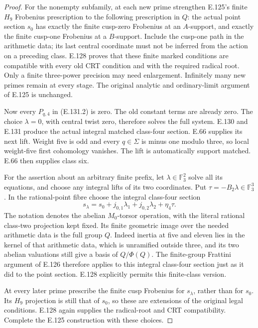\begin{proof}
For the nonempty subfamily, at each new prime strengthen
E.125's finite \(H_9\) Frobenius prescription to the
following prescription in \(Q\): the actual point
section \(s_0\) has exactly the finite cusp-zero
Frobenius at an \(A\)-support, and exactly the finite
cusp-one Frobenius at a \(B\)-support. Include the
cusp-one path in the arithmetic data; its last
central coordinate must not be inferred from the
action on a preceding class.
E.128 proves that these finite marked conditions are
compatible with every old CRT condition and with
the required radical root. Only a finite three-power
precision may need enlargement. Infinitely many
new primes remain at every stage. The original
analytic and ordinary-limit argument of E.125 is
unchanged.

Now every \(P_{q,4}\) in (E.131.2) is zero.
The old constant terms are already zero.
The choice \(\lambda=0\), with central twist zero,
therefore solves the full system. E.130 and E.131
produce the actual integral matched class-four
section. E.66 supplies its next lift. Weight five
is odd and every \(q\in\Sigma\) is minus one modulo
three, so local weight-five first cohomology
vanishes. The lift is automatically support matched.
E.66 then supplies class six.

For the assertion about an arbitrary finite prefix,
let \(\lambda\in\mathbb F_3^2\) solve all its equations,
and choose any integral lifts of its two coordinates.
Put
\(\tau=-B_2\lambda\in\mathbb F_3^3\).
In the rational-point fibre choose the integral
class-four section
\[
       s_\lambda=s_0+
              j_{0,1}\lambda_1+j_{0,2}\lambda_2
                     +\eta_4\tau .
 \tag{E.132.1}
\]
The notation denotes the abelian \(M_0\)-torsor
operation, with the literal rational class-two
projection kept fixed.
Its finite geometric image over the needed
arithmetic data is the full group \(Q\).
Indeed inertia at five and eleven lies in the
kernel of that arithmetic data, which is unramified
outside three, and its two abelian valuations still
give a basis of \(Q/\Phi(Q)\).
The finite-group Frattini argument of E.126
therefore applies to this integral class-four
section just as it did to the point section.
E.128 explicitly permits this finite-class version.

At every later prime prescribe the finite cusp
Frobenius for \(s_\lambda\), rather than for \(s_0\).
Its \(H_9\) projection is still that of \(s_0\),
so these are extensions of the original legal
conditions. E.128 again supplies the radical-root
and CRT compatibility. Complete the E.125
construction with these choices.


\end{proof}
